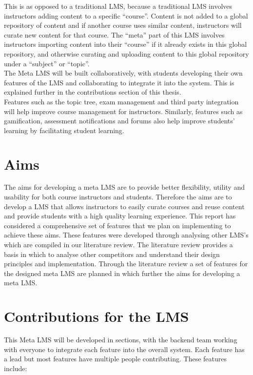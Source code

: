 This is as opposed to a traditional LMS, because a traditional LMS involves instructors adding content to a specific ``course''. Content is not added to a global repository of content and if another course uses similar content, instructors will curate new content for that course. The ``meta'' part of this LMS involves instructors importing content into their ``course'' if it already exists in this global repository, and otherwise curating and uploading content to this global repository under a ``subject'' or ``topic''.\\

The Meta LMS will be built collaboratively, with students developing their own features of the LMS and collaborating to integrate it into the system. This is explained further in the contributions section of this thesis. \\
Features such as the topic tree, exam management and third party integration will help improve course management for instructors. Similarly, features such as gamification, assessment notifications and forums also help improve students' learning by facilitating student learning.\\

\section{Aims}
The aims for developing a meta LMS are to provide better flexibility, utility and usability for both course instructors and students. 
Therefore the aims are to develop a LMS that allows instructors to easily curate courses and reuse content and provide students with a high quality learning experience. 
This report has considered a comprehensive set of features that we plan on implementing to achieve these aims. 
These features were developed through analysing other LMS’s which are compiled in our literature review.
The literature review provides a basis in which to analyse other competitors and understand their design principles and implementation.
Through the literature review a set of features for the designed meta LMS are planned in which further the aims for developing a meta LMS.

\section{Contributions for the LMS}
This Meta LMS will be developed in sections, with the backend team working with everyone to integrate each feature into the overall system. Each feature has a lead but most features have multiple people contributing. These features include:

